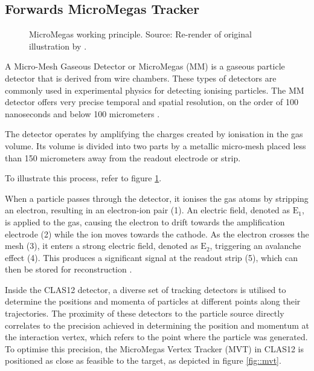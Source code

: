 \subsection{Forwards MicroMegas Tracker}
\label{ssec::forwards_micromegas_tracker}
    \begin{figure}[b!]
        \centering{}
        \caption[MM working principle.]{MicroMegas working principle.
        Source: Re-render of original illustration by \cite{giomataris1996}.}
        \label{fig::mm_principle}
    \end{figure}

    A Micro-Mesh Gaseous Detector or MicroMegas (MM) is a gaseous particle detector that is derived from wire chambers.
    These types of detectors are commonly used in experimental physics for detecting ionising particles.
    The MM detector offers very precise temporal and spatial resolution, on the order of 100 nanoseconds and below 100 micrometers \cite{giomataris1996}.

    The detector operates by amplifying the charges created by ionisation in the gas volume.
    Its volume is divided into two parts by a metallic micro-mesh placed less than 150 micrometers away from the readout electrode or strip.

    To illustrate this process, refer to figure \ref{fig::mm_principle}.

    When a particle passes through the detector, it ionises the gas atoms by stripping an electron, resulting in an electron-ion pair (1).
    An electric field, denoted as $\text{E}_1$, is applied to the gas, causing the electron to drift towards the amplification electrode (2) while the ion moves towards the cathode.
    As the electron crosses the mesh (3), it enters a strong electric field, denoted as $\text{E}_2$, triggering an avalanche effect (4).
    This produces a significant signal at the readout strip (5), which can then be stored for reconstruction \cite{giomataris1996}.

    Inside the CLAS12 detector, a diverse set of tracking detectors is utilised to determine the positions and momenta of particles at different points along their trajectories.
    The proximity of these detectors to the particle source directly correlates to the precision achieved in determining the position and momentum at the interaction vertex, which refers to the point where the particle was generated.
    To optimise this precision, the MicroMegas Vertex Tracker (MVT) in CLAS12 is positioned as close as feasible to the target, as depicted in figure \ref{fig::mvt}.

